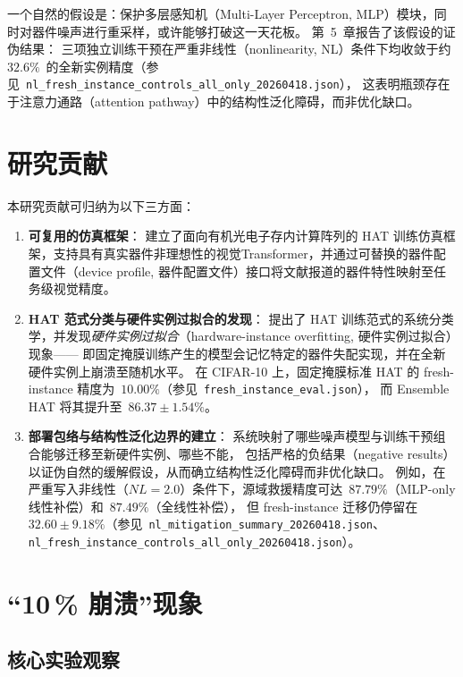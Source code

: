一个自然的假设是：保护多层感知机（Multi-Layer Perceptron, MLP）模块，同时对器件噪声进行重采样，或许能够打破这一天花板。
第~5~章报告了该假设的证伪结果：
三项独立训练干预在严重非线性（nonlinearity, NL）条件下均收敛于约~$32.6\%$~的全新实例精度（参见~\texttt{nl\_fresh\_instance\_controls\_all\_only\_20260418.json}），
这表明瓶颈存在于注意力通路（attention pathway）中的结构性泛化障碍，而非优化缺口。

\section{研究贡献}

本研究贡献可归纳为以下三方面：

\begin{enumerate}
    \item \textbf{可复用的仿真框架}：
    建立了面向有机光电子存内计算阵列的 HAT 训练仿真框架，支持具有真实器件非理想性的视觉Transformer，并通过可替换的器件配置文件（device profile, 器件配置文件）接口将文献报道的器件特性映射至任务级视觉精度。
    
    \item \textbf{HAT 范式分类与硬件实例过拟合的发现}：
    提出了 HAT 训练范式的系统分类学，并发现\emph{硬件实例过拟合}（hardware-instance overfitting, 硬件实例过拟合）现象——
    即固定掩膜训练产生的模型会记忆特定的器件失配实现，并在全新硬件实例上崩溃至随机水平。
    在 CIFAR-10 上，固定掩膜标准 HAT 的 fresh-instance 精度为~$10.00\%$（参见~\texttt{fresh\_instance\_eval.json}），
    而 Ensemble HAT 将其提升至~$86.37\pm1.54\%$。
    
    \item \textbf{部署包络与结构性泛化边界的建立}：
    系统映射了哪些噪声模型与训练干预组合能够迁移至新硬件实例、哪些不能，
    包括严格的负结果（negative results）以证伪自然的缓解假设，从而确立结构性泛化障碍而非优化缺口。
    例如，在严重写入非线性（$NL=2.0$）条件下，源域救援精度可达~$87.79\%$（MLP-only 线性补偿）和~$87.49\%$（全线性补偿），
    但 fresh-instance 迁移仍停留在~$32.60\pm9.18\%$（参见~\texttt{nl\_mitigation\_summary\_20260418.json}、\texttt{nl\_fresh\_instance\_controls\_all\_only\_20260418.json}）。
\end{enumerate}

\section{``10\,\% 崩溃''现象}

\subsection{核心实验观察}


